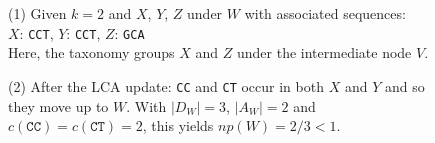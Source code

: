 \documentclass[pdflatex,sn-vancouver-num]{sn-jnl}
\begin{document}
    \begin{figure}[h]%
        \centering
        \small
        \begin{minipage}[c]{0.25\textwidth}
            \begin{flushleft}(1) Given $k = 2$ and $X$, $Y$, $Z$ under $W$ with associated sequences:\\
                $X$: \texttt{CCT}, $Y$: \texttt{CCT}, $Z$: \texttt{GCA}\\
                Here, the taxonomy groups $X$ and $Z$ under the intermediate node $V$.
            \end{flushleft}
        \end{minipage}
        \begin{minipage}[c]{0.2\textwidth}
        \end{minipage}
        \begin{minipage}[c]{0.25\textwidth}
            \begin{flushleft}(2) After the LCA update: \texttt{CC} and \texttt{CT} occur in both $X$ and $Y$ and so they move up to $W$. With $|D_W| = 3$, $|A_W| = 2$ and $c(\texttt{CC}) = c(\texttt{CT}) = 2$, this yields $np(W) = 2/3 < 1$.
            \end{flushleft}
        \end{minipage}
        \begin{minipage}[c]{0.2\textwidth}
        \end{minipage}

        \vspace{0.2cm}


\end{figure}
\end{document}
